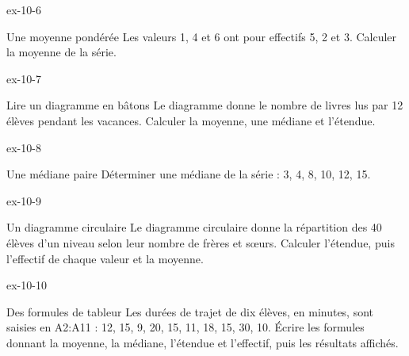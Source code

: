 \begin{blocLivre}{ex-10-6}\begin{exercice}[2]{Une moyenne pondérée}
Les valeurs 1, 4 et 6 ont pour effectifs 5, 2 et 3. Calculer la moyenne de la série.
\end{exercice}\end{blocLivre}
\begin{blocLivre}{ex-10-7}\begin{exercice}[2]{Lire un diagramme en bâtons}
Le diagramme donne le nombre de livres lus par 12 élèves pendant les vacances. Calculer la moyenne, une médiane et l’étendue.
\label{fig-ex-10-7}
\end{exercice}\end{blocLivre}
\begin{blocLivre}{ex-10-8}\begin{exercice}[2]{Une médiane paire}
Déterminer une médiane de la série : 3, 4, 8, 10, 12, 15.
\end{exercice}\end{blocLivre}
\begin{blocLivre}{ex-10-9}\begin{exercice}[2]{Un diagramme circulaire}
Le diagramme circulaire donne la répartition des 40 élèves d’un niveau selon leur nombre de frères et sœurs. Calculer l’étendue, puis l’effectif de chaque valeur et la moyenne.
\label{fig-ex-10-9}
\end{exercice}\end{blocLivre}
\begin{blocLivre}{ex-10-10}\begin{exercice}[2]{Des formules de tableur}
Les durées de trajet de dix élèves, en minutes, sont saisies en A2:A11 : 12, 15, 9, 20, 15, 11, 18, 15, 30, 10. Écrire les formules donnant la moyenne, la médiane, l’étendue et l’effectif, puis les résultats affichés.
\end{exercice}\end{blocLivre}

